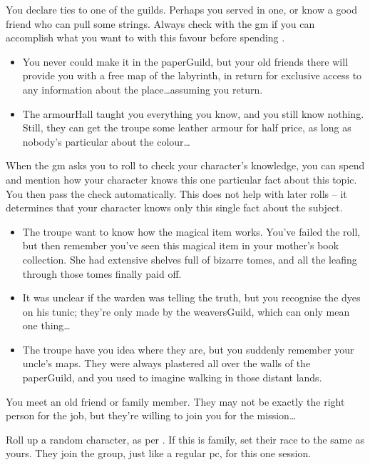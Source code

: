 \begin{multicols}{2}
You declare ties to one of the guilds.
Perhaps you served in one, or know a good friend who can pull some strings.
Always check with the \gls{gm} if you can accomplish what you want to with this favour before spending .

\begin{itemize}
  \item
  You never could make it in the \gls{paperGuild}, but your old friends there will provide you with a free map of the labyrinth, in return for exclusive access to any information about the place\ldots assuming you return.
  \item
  The \gls{armourHall} taught you everything you know, and you still know nothing.
  Still, they can get the troupe some leather armour for half price, as long as nobody's particular about the colour\ldots
\end{itemize}

\label{randomFact}
When the \gls{gm} asks you to roll to check your character's knowledge, you can spend  and mention how your character knows this one particular fact about this topic.
You then pass the check automatically.
This does not help with later rolls -- it determines that your character knows only this single fact about the subject.

\begin{itemize}
  \item
  The troupe want to know how the magical item works.
  You've failed the roll, but then remember you've seen this magical item in your mother's book collection.
  She had extensive shelves full of bizarre tomes, and all the leafing through those tomes finally paid off.
  \item
  It was unclear if the \gls{warden} was telling the truth, but you recognise the dyes on his tunic; they're only made by the \gls{weaversGuild}, which can only mean one thing\ldots
  \item
  The troupe have you idea where they are, but you suddenly remember your uncle's maps.
  They were always plastered all over the walls of the \gls{paperGuild}, and you used to imagine walking in those distant lands.
\end{itemize}

\label{oldFriend}
You meet an old friend or family member.
They may not be exactly the right person for the job, but they're willing to join you for the mission\ldots

Roll up a random character, as per .
If this is family, set their race to the same as yours.
They join the group, just like a regular \gls{pc}, for this one session.


\end{multicols}
